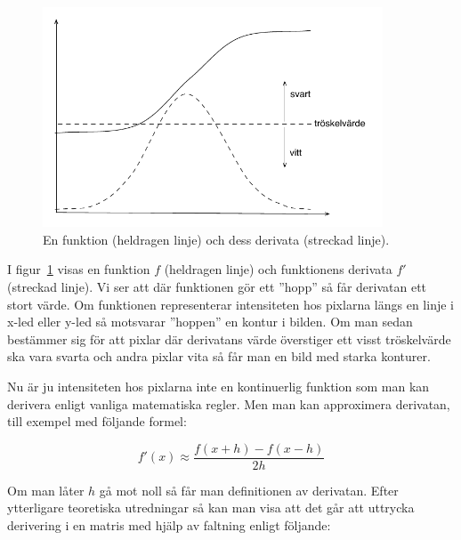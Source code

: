 \begin{figure}[H]
\includegraphics[width=0.9\textwidth]{../img/w12-assignment-photo/derivatabild2.pdf}
\caption { En funktion (heldragen linje) och dess derivata (streckad linje).}
\label{fig:photo:sobelfilter:derivatabild}
\end{figure}

I figur~\ref{fig:photo:sobelfilter:derivatabild} visas en funktion $f$ (heldragen linje) och funktionens derivata $f'$ (streckad linje). Vi ser att där funktionen gör ett ''hopp'' så får derivatan ett stort värde. Om funktionen representerar intensiteten hos pixlarna längs en linje i x-led eller y-led så motsvarar ''hoppen'' en kontur i bilden. Om man sedan bestämmer sig för att pixlar där derivatans värde överstiger ett visst tröskelvärde ska vara svarta och andra pixlar vita så får man en bild med starka konturer.

Nu är ju intensiteten hos pixlarna inte en kontinuerlig funktion som man kan derivera enligt vanliga matematiska regler. Men man kan approximera derivatan, till exempel med följande formel:

\begin{displaymath}
f'(x) \approx \frac{f(x+h) - f(x-h)}{2h}
\end{displaymath}

Om man låter $h$ gå mot noll så får man definitionen av derivatan.
Efter ytterligare teoretiska utredningar så kan man visa att det går att uttrycka derivering i en matris med hjälp av faltning enligt följande:
% 

